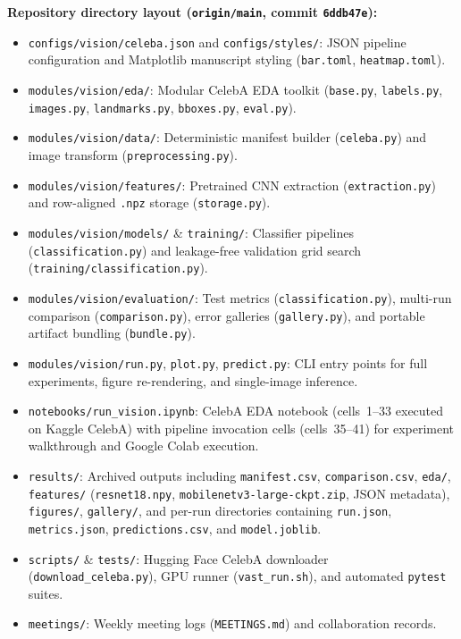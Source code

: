 \documentclass[12pt,a4paper]{article}
\newcommand{\code}[1]{\texttt{#1}}
\begin{document}
\textbf{Repository directory layout (\code{origin/\allowbreak{}main}, commit \code{6ddb47e}):}
\begin{itemize}[leftmargin=18pt, itemsep=1.5pt]
  \item \code{configs/\allowbreak{}vision/\allowbreak{}celeba.json} and \code{configs/\allowbreak{}styles/\allowbreak{}}: JSON pipeline configuration and Matplotlib manuscript styling (\code{bar.toml}, \code{heatmap.toml}).
  \item \code{modules/\allowbreak{}vision/\allowbreak{}eda/\allowbreak{}}: Modular CelebA EDA toolkit (\code{base.py}, \code{labels.py}, \code{images.py}, \code{landmarks.py}, \code{bboxes.py}, \code{eval.py}).
  \item \code{modules/\allowbreak{}vision/\allowbreak{}data/\allowbreak{}}: Deterministic manifest builder (\code{celeba.py}) and image transform (\code{preprocessing.py}).
  \item \code{modules/\allowbreak{}vision/\allowbreak{}features/\allowbreak{}}: Pretrained CNN extraction (\code{extraction.py}) and row-aligned \code{.npz} storage (\code{storage.py}).
  \item \code{modules/\allowbreak{}vision/\allowbreak{}models/\allowbreak{}} \& \code{training/\allowbreak{}}: Classifier pipelines (\code{classification.py}) and leakage-free validation grid search (\code{training/\allowbreak{}classification.py}).
  \item \code{modules/\allowbreak{}vision/\allowbreak{}evaluation/\allowbreak{}}: Test metrics (\code{classification.py}), multi-run comparison (\code{comparison.py}), error galleries (\code{gallery.py}), and portable artifact bundling (\code{bundle.py}).
  \item \code{modules/\allowbreak{}vision/\allowbreak{}run.py}, \code{plot.py}, \code{predict.py}: CLI entry points for full experiments, figure re-rendering, and single-image inference.
  \item \code{notebooks/\allowbreak{}run\_\allowbreak{}vision.ipynb}: CelebA EDA notebook (cells~1--33 executed on Kaggle CelebA) with pipeline invocation cells (cells~35--41) for experiment walkthrough and Google Colab execution.
  \item \code{results/\allowbreak{}}: Archived outputs including \code{manifest.csv}, \code{comparison.csv}, \code{eda/}, \code{features/} (\code{resnet18.npy}, \code{mobilenetv3-large-ckpt.zip}, JSON metadata), \code{figures/}, \code{gallery/}, and per-run directories containing \code{run.json}, \code{metrics.json}, \code{predictions.csv}, and \code{model.joblib}.
  \item \code{scripts/\allowbreak{}} \& \code{tests/\allowbreak{}}: Hugging Face CelebA downloader (\code{download\_\allowbreak{}celeba.py}), GPU runner (\code{vast\_\allowbreak{}run.sh}), and automated \code{pytest} suites.
  \item \code{meetings/}: Weekly meeting logs (\code{MEETINGS.md}) and collaboration records.
\end{itemize}
\end{document}
